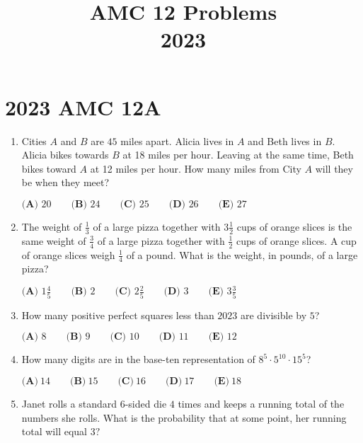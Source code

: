 \documentclass{article}
\title{AMC 12 Problems \\ 2023}
\date{}
\begin{document}
\maketitle\thispagestyle{fancy}\newpage\section*{2023 AMC 12A}
\begin{enumerate}[label=\arabic*., itemsep=0.5em]
\item Cities \(A\) and \(B\) are \(45\) miles apart. Alicia lives in \(A\) and Beth lives in \(B\). Alicia bikes towards \(B\) at 18 miles per hour. Leaving at the same time, Beth bikes toward \(A\) at 12 miles per hour. How many miles from City \(A\) will they be when they meet?

\(\textbf{(A) }20\qquad\textbf{(B) }24\qquad\textbf{(C) }25\qquad\textbf{(D) }26\qquad\textbf{(E) }27\)\par \vspace{0.5em}\item The weight of \(\frac{1}{3}\) of a large pizza together with \(3 \frac{1}{2}\) cups of orange slices is the same weight of \(\frac{3}{4}\) of a large pizza together with \(\frac{1}{2}\) cups of orange slices. A cup of orange slices weigh \(\frac{1}{4}\) of a pound. What is the weight, in pounds, of a large pizza?

\(\textbf{(A) }1\frac{4}{5}\qquad\textbf{(B) }2\qquad\textbf{(C) }2\frac{2}{5}\qquad\textbf{(D) }3\qquad\textbf{(E) }3\frac{3}{5}\)\par \vspace{0.5em}\item How many positive perfect squares less than \(2023\) are divisible by \(5\)?

\(\textbf{(A) }8\qquad\textbf{(B) }9\qquad\textbf{(C) }10\qquad\textbf{(D) }11\qquad\textbf{(E) }12\)\par \vspace{0.5em}\item How many digits are in the base-ten representation of \(8^5 \cdot 5^{10} \cdot 15^5\)?

\(\textbf{(A)}~14\qquad\textbf{(B)}~15\qquad\textbf{(C)}~16\qquad\textbf{(D)}~17\qquad\textbf{(E)}~18\qquad\)\par \vspace{0.5em}\item Janet rolls a standard \(6\)-sided die \(4\) times and keeps a running total of the numbers she rolls. What is the probability that at some point, her running total will equal \(3?\)


\end{enumerate}
\end{document}
